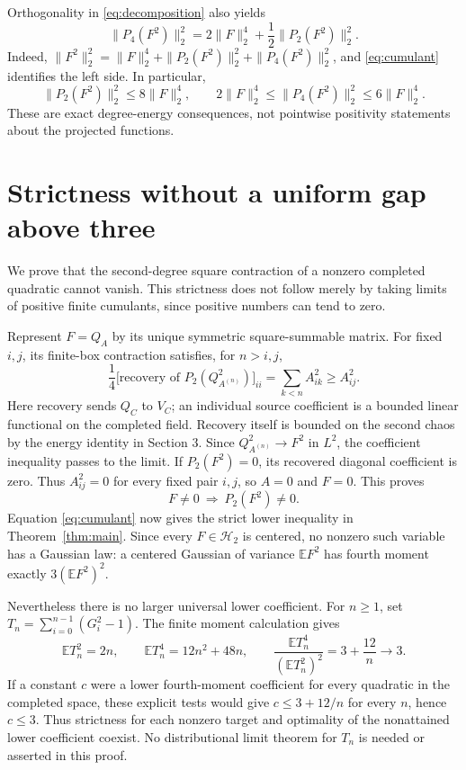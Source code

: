 \documentclass[11pt]{article}
\newcommand{\E}{\mathbb E}
\newcommand{\Hh}{\mathcal H}
\begin{document}
Orthogonality in \eqref{eq:decomposition} also yields
\begin{equation}\label{eq:P4energy}
 \|P_4(F^2)\|_2^2
 =2\|F\|_2^4+\frac12\|P_2(F^2)\|_2^2.
\end{equation}
Indeed, $\|F^2\|_2^2=\|F\|_2^4+\|P_2(F^2)\|_2^2+
\|P_4(F^2)\|_2^2$, and \eqref{eq:cumulant} identifies the left
side. In particular,
\[
 \|P_2(F^2)\|_2^2\leq8\|F\|_2^4,\qquad
 2\|F\|_2^4\leq\|P_4(F^2)\|_2^2\leq6\|F\|_2^4.
\]
These are exact degree-energy consequences, not pointwise positivity
statements about the projected functions.

\section{Strictness without a uniform gap above three}
We prove that the second-degree square contraction of a nonzero
completed quadratic cannot vanish. This strictness does not follow
merely by taking limits of positive finite cumulants, since positive
numbers can tend to zero.

Represent $F=Q_A$ by its unique symmetric square-summable matrix.
For fixed $i,j$, its finite-box contraction satisfies, for $n>i,j$,
\[
 \frac14\bigl[\text{recovery of }P_2(Q_{A^{(n)}}^2)\bigr]_{ii}
 =\sum_{k<n}A_{ik}^2\geq A_{ij}^2.
\]
Here recovery sends $Q_C$ to $V_C$; an individual source coefficient
is a bounded linear functional on the completed field. Recovery
itself is bounded on the second chaos by the energy identity in
Section 3. Since $Q_{A^{(n)}}^2\to F^2$ in $L^2$, the coefficient
inequality passes to the limit. If $P_2(F^2)=0$, its recovered
diagonal coefficient is zero. Thus $A_{ij}^2=0$ for every fixed
pair $i,j$, so $A=0$ and $F=0$. This proves
\[
 F\ne0\ \Longrightarrow\ P_2(F^2)\ne0.
\]
Equation \eqref{eq:cumulant} now gives the strict lower inequality
in Theorem~\ref{thm:main}. Since every $F\in\Hh_2$ is centered,
no nonzero such variable has a Gaussian law: a centered Gaussian
of variance $\E F^2$ has fourth moment exactly $3(\E F^2)^2$.

Nevertheless there is no larger universal lower coefficient.
For $n\geq1$, set $T_n=\sum_{i=0}^{n-1}(G_i^2-1)$. The finite
moment calculation gives
\[
 \E T_n^2=2n,\qquad \E T_n^4=12n^2+48n,\qquad
 \frac{\E T_n^4}{(\E T_n^2)^2}=3+\frac{12}{n}\longrightarrow3.
\]
If a constant $c$ were a lower fourth-moment coefficient for every
quadratic in the completed space, these explicit tests would give
$c\leq3+12/n$ for every $n$, hence $c\leq3$. Thus strictness for
each nonzero target and optimality of the nonattained lower
coefficient coexist. No distributional limit theorem for $T_n$
is needed or asserted in this proof.
\end{document}
